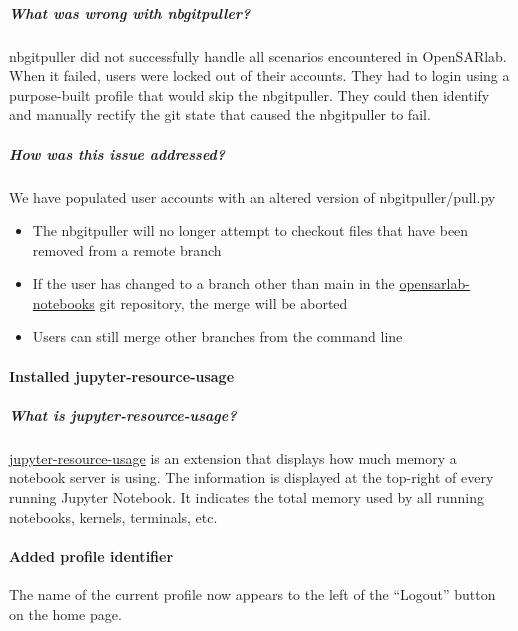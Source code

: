 \subparagraph{What was wrong with nbgitpuller?}

nbgitpuller did not successfully handle all scenarios encountered in OpenSARlab. When it failed, users were locked out of their accounts. They had to login using a purpose-built profile that would skip the nbgitpuller. They could then identify and manually rectify the git state that caused the nbgitpuller to fail.

\subparagraph{How was this issue addressed?}

We have populated user accounts with an altered version of nbgitpuller/pull.py

\begin{itemize}
\item The nbgitpuller will no longer attempt to checkout files that have been removed from a remote branch
\item If the user has changed to a branch other than main in the \href{https://github.com/ASFOpenSARlab}{opensarlab-notebooks} git repository, the merge will be aborted
\item Users can still merge other branches from the command line
\end{itemize}

\paragraph{Installed jupyter-resource-usage}

\subparagraph{What is jupyter-resource-usage?}

\href{https://github.com/jupyter-server/jupyter-resource-usage}{jupyter-resource-usage} is an extension that displays how much memory a notebook server is using. The information is displayed at the top-right of every running Jupyter Notebook. It indicates the total memory used by all running notebooks, kernels, terminals, etc.

\paragraph{Added profile identifier}

The name of the current profile now appears to the left of the ``Logout'' button on the home page.